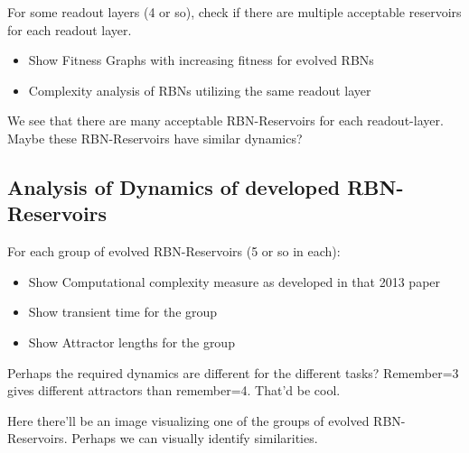 For some readout layers (4 or so), check if there are multiple acceptable reservoirs for each readout layer.

\begin{itemize}
  \item Show Fitness Graphs with increasing fitness for evolved RBNs
  \item Complexity analysis of RBNs utilizing the same readout layer
\end{itemize}

We see that there are many acceptable RBN-Reservoirs for each readout-layer.
Maybe these RBN-Reservoirs have similar dynamics?


\subsection{Analysis of Dynamics of developed RBN-Reservoirs}

For each group of evolved RBN-Reservoirs (5 or so in each):

\begin{itemize}
  \item Show Computational complexity measure as developed in that 2013 paper
  \item Show transient time for the group
  \item Show Attractor lengths for the group
\end{itemize}


Perhaps the required dynamics are different for the different tasks?
Remember=3 gives different attractors than remember=4. That'd be cool.


Here there'll be an image visualizing one of the groups of evolved RBN-Reservoirs.
Perhaps we can visually identify similarities.
